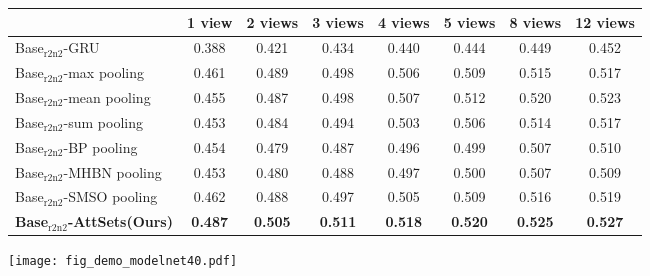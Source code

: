 \documentclass[twocolumn]{svjour3}    \pdfoutput=1
\newcommand{\nickname}{AttSets}
\newcommand{\ie}{\textit{i}.\textit{e}., }
\begin{document}
\begin{table*}[t]
\caption{Group 2: mean IoU for multi-view reconstruction of all 40 categories in ModelNet40 testing split. All networks are firstly trained given only 1 image for each object in Stage 1. The \nickname{} module is further trained given random number of images per object in Stage 2, \ie $N$ is uniformly sampled from \textbf{[1, 12]}, while other competing approaches are fine-tuned given random number of views per object in Stage 2.}
\centering
\label{tab:iou_modelnet_allv}
\tabcolsep=0.4cm
\begin{tabular}{ l|ccccccc}
\hline
&1 view&2 views&3 views& 4 views&5 views&8 views&12 views \\
\hline
Base$_{\textrm{r2n2}}$-GRU &0.388&0.421&0.434&0.440&0.444&0.449&0.452\\
Base$_{\textrm{r2n2}}$-max pooling &0.461&0.489&0.498&0.506&0.509&0.515&0.517\\
Base$_{\textrm{r2n2}}$-mean pooling &0.455&0.487&0.498&0.507&0.512&0.520&0.523\\
Base$_{\textrm{r2n2}}$-sum pooling &0.453&0.484&0.494&0.503&0.506&0.514&0.517\\
Base$_{\textrm{r2n2}}$-BP pooling &0.454&0.479&0.487&0.496&0.499&0.507&0.510\\
Base$_{\textrm{r2n2}}$-MHBN pooling &0.453&0.480&0.488&0.497&0.500&0.507&0.509\\
Base$_{\textrm{r2n2}}$-SMSO pooling &0.462&0.488&0.497&0.505&0.509&0.516&0.519\\
\textbf{Base$_{\textrm{r2n2}}$-\nickname{}(Ours)} &\textbf{0.487}&\textbf{0.505}&\textbf{0.511}&\textbf{0.518}&\textbf{0.520}&\textbf{0.525}
&\textbf{0.527} \\
\hline
\end{tabular}
\vspace{-0.1 cm}
\end{table*}
\begin{figure*}[t]
\centering
   \texttt{[image: fig\_demo\_modelnet40.pdf]}
\caption{Qualitative results of multi-view reconstruction from different approaches in ModelNet40 testing split.}
\label{fig:mv_demo_modelnet40}
\vspace{-0.4cm}
\end{figure*}
\end{document}
